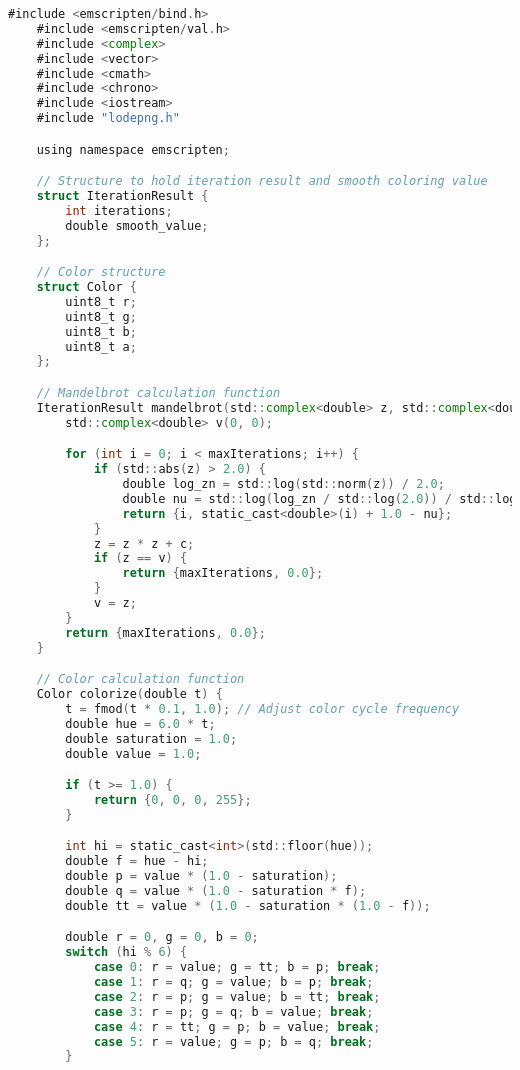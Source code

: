 \begin{lstlisting}[language=go, frame=tb, caption={Mandelbrot Set Calculation (WASM build)}]
    #include <emscripten/bind.h>
    #include <emscripten/val.h>
    #include <complex>
    #include <vector>
    #include <cmath>
    #include <chrono>
    #include <iostream>
    #include "lodepng.h"

    using namespace emscripten;

    // Structure to hold iteration result and smooth coloring value
    struct IterationResult {
        int iterations;
        double smooth_value;
    };

    // Color structure
    struct Color {
        uint8_t r;
        uint8_t g;
        uint8_t b;
        uint8_t a;
    };

    // Mandelbrot calculation function
    IterationResult mandelbrot(std::complex<double> z, std::complex<double> c, int maxIterations) {
        std::complex<double> v(0, 0);

        for (int i = 0; i < maxIterations; i++) {
            if (std::abs(z) > 2.0) {
                double log_zn = std::log(std::norm(z)) / 2.0;
                double nu = std::log(log_zn / std::log(2.0)) / std::log(2.0);
                return {i, static_cast<double>(i) + 1.0 - nu};
            }
            z = z * z + c;
            if (z == v) {
                return {maxIterations, 0.0};
            }
            v = z;
        }
        return {maxIterations, 0.0};
    }

    // Color calculation function
    Color colorize(double t) {
        t = fmod(t * 0.1, 1.0); // Adjust color cycle frequency
        double hue = 6.0 * t;
        double saturation = 1.0;
        double value = 1.0;

        if (t >= 1.0) {
            return {0, 0, 0, 255};
        }

        int hi = static_cast<int>(std::floor(hue));
        double f = hue - hi;
        double p = value * (1.0 - saturation);
        double q = value * (1.0 - saturation * f);
        double tt = value * (1.0 - saturation * (1.0 - f));

        double r = 0, g = 0, b = 0;
        switch (hi % 6) {
            case 0: r = value; g = tt; b = p; break;
            case 1: r = q; g = value; b = p; break;
            case 2: r = p; g = value; b = tt; break;
            case 3: r = p; g = q; b = value; break;
            case 4: r = tt; g = p; b = value; break;
            case 5: r = value; g = p; b = q; break;
        }


\end{lstlisting}
